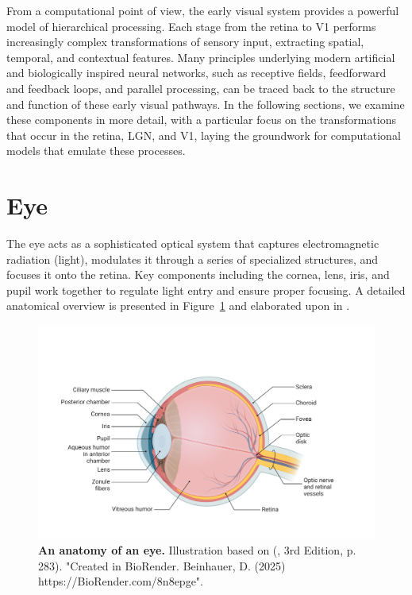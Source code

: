 From a computational point of view, the early visual system provides a powerful model of hierarchical processing. Each stage from the retina to V1 performs increasingly complex transformations of sensory input, extracting spatial, temporal, and contextual features. Many principles underlying modern artificial and biologically inspired neural networks, such as receptive fields, feedforward and feedback loops, and parallel processing, can be traced back to the structure and function of these early visual pathways. In the following sections, we examine these components in more detail, with a particular focus on the transformations that occur in the retina, LGN, and V1, laying the groundwork for computational models that emulate these processes.

\section{Eye}
\label{sec:eye}

The eye acts as a sophisticated optical system that captures electromagnetic radiation (light), modulates it through a series of specialized structures, and focuses it onto the retina. Key components including the cornea, lens, iris, and pupil work together to regulate light entry and ensure proper focusing. A detailed anatomical overview is presented in Figure~\ref{fig:eye} and elaborated upon in \citet{snell2013clinical}.

\begin{figure}
    \centering
    \includegraphics[width=\linewidth]{img/eye.pdf}
    \caption{\textbf{An anatomy of an eye.} Illustration based on (\citet{bear2020neuroscience}, 3rd Edition, p. 283). "Created in BioRender. Beinhauer, D. (2025) https://BioRender.com/8n8epge".}
    \label{fig:eye}
\end{figure}


